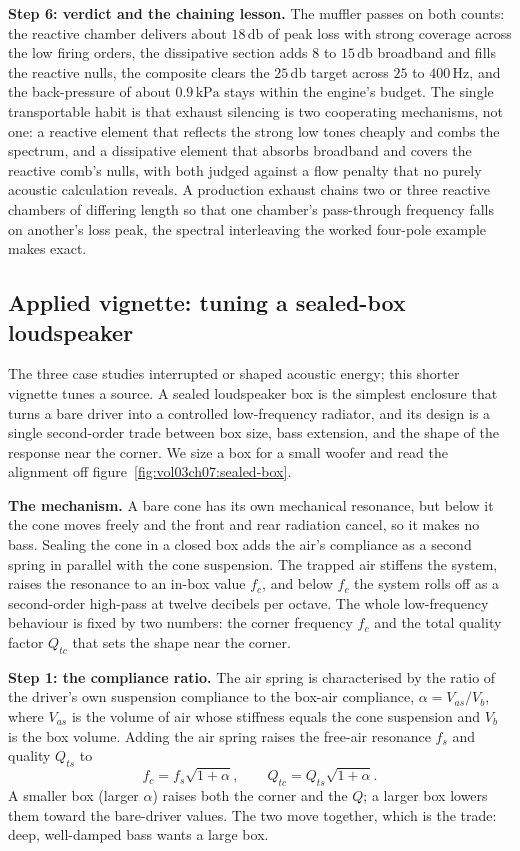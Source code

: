 \textbf{Step 6: verdict and the chaining lesson.} The muffler passes on
both counts: the reactive chamber delivers about $18\,\si{\decibel}$ of
peak loss with strong coverage across the low firing orders, the
dissipative section adds $8$ to $15\,\si{\decibel}$ broadband and fills the
reactive nulls, the composite clears the $25\,\si{\decibel}$ target across
$25$ to $400\,\si{\hertz}$, and the back-pressure of about
$0.9\,\si{\kilo\pascal}$ stays within the engine's budget. The single
transportable habit is that exhaust silencing is two cooperating
mechanisms, not one: a reactive element that reflects the strong low tones
cheaply and combs the spectrum, and a dissipative element that absorbs
broadband and covers the reactive comb's nulls, with both judged against a
flow penalty that no purely acoustic calculation reveals. A production
exhaust chains two or three reactive chambers of differing length so that
one chamber's pass-through frequency falls on another's loss peak, the
spectral interleaving the worked four-pole example makes exact.

\subsection{Applied vignette: tuning a sealed-box loudspeaker}

The three case studies interrupted or shaped acoustic energy; this shorter
vignette tunes a source. A sealed loudspeaker box is the simplest enclosure
that turns a bare driver into a controlled low-frequency radiator, and its
design is a single second-order trade between box size, bass extension, and
the shape of the response near the corner. We size a box for a small
woofer and read the alignment off
figure~\ref{fig:vol03ch07:sealed-box}.

\textbf{The mechanism.} A bare cone has its own mechanical resonance, but
below it the cone moves freely and the front and rear radiation cancel, so
it makes no bass. Sealing the cone in a closed box adds the air's
compliance as a second spring in parallel with the cone suspension. The
trapped air stiffens the system, raises the resonance to an in-box value
$f_c$, and below $f_c$ the system rolls off as a second-order high-pass at
twelve decibels per octave. The whole low-frequency behaviour is fixed by
two numbers: the corner frequency $f_c$ and the total quality factor
$Q_{tc}$ that sets the shape near the corner.

\textbf{Step 1: the compliance ratio.} The air spring is characterised by
the ratio of the driver's own suspension compliance to the box-air
compliance, $\alpha = V_{as}/V_b$, where $V_{as}$ is the volume of air
whose stiffness equals the cone suspension and $V_b$ is the box volume.
Adding the air spring raises the free-air resonance $f_s$ and quality $Q_{ts}$
to
\[
f_c = f_s\sqrt{1+\alpha}, \qquad Q_{tc} = Q_{ts}\sqrt{1+\alpha}.
\]
A smaller box (larger $\alpha$) raises both the corner and the $Q$; a
larger box lowers them toward the bare-driver values. The two move
together, which is the trade: deep, well-damped bass wants a large box.

